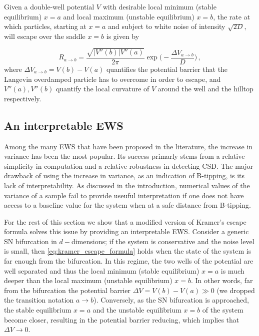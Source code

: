 \documentclass[a4paper,fleqn]{cas-sc}
\begin{document}
Given a double-well potential $V$ with desirable local minimum (stable equilibrium) $x=a$ and local maximum (unstable equilibrium) $x=b$, the rate at which particles, starting at $x=a$ and subject to white noise of intensity $\sqrt{2D}$, will escape over the saddle $x=b$ is given by
 
\begin{equation}\label{eq:kramer_escape_formula}
        R_{a\to b} = \frac{\sqrt{|V''(b)|V''(a)}}{2\pi}\exp\bigg(-\frac{\Delta V_{a\to b}}{D}\bigg)\,,
\end{equation}
%
where $\Delta V_{a\to b} = V(b) - V(a)$ quantifies the potential barrier that the Langevin overdamped particle has to overcome in order to escape, and $V''(a),V''(b)$ quantify the local curvature of $V$ around the well and the hilltop respectively.
%
\subsection{An interpretable EWS}\label{subsec:modified_escape_ews}
Among the many EWS that have been proposed in the literature, the increase in variance has been the most popular.
Its success primarly stems from a relative simplicity in computation and a relative robustness in detecting CSD.
The major drawback of using the increase in variance, as an indication of B-tipping, is its lack of interpretability.
As discussed in the introduction, numerical values of the variance of a sample fail to provide useuful interpretation if one does not have access to a baseline value for the system when at a safe distance from B-tipping.

For the rest of this section we show that a modified version of Kramer's escape formula solves this issue by providing an interpretable EWS.
Consider a generic SN bifurcation in $d-$dimensions; if the system is conservative and the noise level is small, then \eqref{eq:kramer_escape_formula} holds when the state of the system is far enough from the bifurcation.
In this regime, the two wells of the potential are well separated and thus the local minimum (stable equilibrium) $x=a$ is much deeper than the local maximum (unstable equilibrium) $x=b$.
In other words, far from the bifurcation the potential barrier $\Delta V = V(b) - V(a) \gg 0$ (we dropped the transition notation $a\to b$).
Conversely, as the SN bifurcation is approached, the stable equilibrium $x=a$ and the unstable equilibrium $x=b$ of the system become closer, resulting in the potential barrier reducing, which implies that $\Delta V\to0$.
\end{document}
